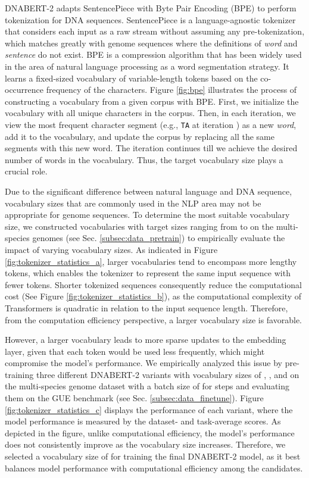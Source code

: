 \documentclass{article}
\begin{document}
DNABERT-2 adapts SentencePiece \citep{sentencepiece} with Byte Pair Encoding (BPE) \citep{bpe} to perform tokenization for DNA sequences.
SentencePiece is a language-agnostic tokenizer that considers each input as a raw stream without assuming any pre-tokenization, which matches greatly with genome sequences where the definitions of \textit{word} and \textit{sentence} do not exist.
BPE is a compression algorithm that has been widely used in the area of natural language processing as a word segmentation strategy. It learns a fixed-sized vocabulary of variable-length tokens based on the co-occurrence frequency of the characters. 
Figure \ref{fig:bpe} illustrates the process of constructing a vocabulary from a given corpus with BPE. First, we initialize the vocabulary with all unique characters in the corpus. Then, in each iteration, we view the most frequent character segment (e.g., \texttt{TA} at iteration ) as a new \textit{word}, add it to the vocabulary, and update the corpus by replacing all the same segments with this new word. The iteration continues till we achieve the desired number of words in the vocabulary. Thus, the target vocabulary size plays a crucial role.

Due to the significant difference between natural language and DNA sequence, vocabulary sizes that are commonly used in the NLP area \citep{bert, transformer, t5, gpt4} may not be appropriate for genome sequences. To determine the most suitable vocabulary size, we constructed  vocabularies with target sizes ranging from  to  on the multi-species genomes (see Sec. \ref{subsec:data_pretrain}) to empirically evaluate the impact of varying vocabulary sizes. As indicated in Figure \ref{fig:tokenizer_statistics_a}, larger vocabularies tend to encompass more lengthy tokens, which enables the tokenizer to represent the same input sequence with fewer tokens. Shorter tokenized sequences consequently reduce the computational cost (See Figure \ref{fig:tokenizer_statistics_b}), as the computational complexity of Transformers is quadratic in relation to the input sequence length. Therefore, from the computation efficiency perspective, a larger vocabulary size is favorable.

However, a larger vocabulary leads to more sparse updates to the embedding layer, given that each token would be used less frequently, which might compromise the model's performance. We empirically analyzed this issue by pre-training three different DNABERT-2 variants with vocabulary sizes of , , and  on the multi-species genome dataset with a batch size of  for  steps and evaluating them on the GUE benchmark (see Sec. \ref{subsec:data_finetune}). Figure \ref{fig:tokenizer_statistics_c} displays the performance of each variant, where the model performance is measured by the dataset- and task-average scores. As depicted in the figure, unlike computational efficiency, the model's performance does not consistently improve as the vocabulary size increases. Therefore, we selected a vocabulary size of  for training the final DNABERT-2 model, as it best balances model performance with computational efficiency among the candidates.
\end{document}
